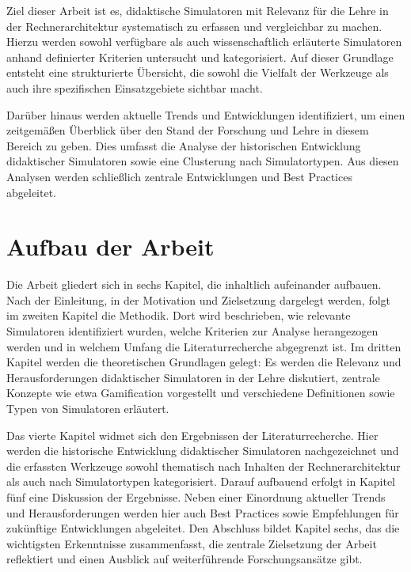 Ziel dieser Arbeit ist es, didaktische Simulatoren mit Relevanz für die Lehre in der Rechnerarchitektur systematisch zu erfassen und vergleichbar zu machen. Hierzu werden sowohl verfügbare als auch wissenschaftlich erläuterte Simulatoren anhand definierter Kriterien untersucht und kategorisiert. Auf dieser Grundlage entsteht eine strukturierte Übersicht, die sowohl die Vielfalt der Werkzeuge als auch ihre spezifischen Einsatzgebiete sichtbar macht.

Darüber hinaus werden aktuelle Trends und Entwicklungen identifiziert, um einen zeitgemäßen Überblick über den Stand der Forschung und Lehre in diesem Bereich zu geben. Dies umfasst die Analyse der historischen Entwicklung didaktischer Simulatoren sowie eine Clusterung nach Simulatortypen. Aus diesen Analysen werden schließlich zentrale Entwicklungen und Best Practices abgeleitet.

\section{Aufbau der Arbeit}

Die Arbeit gliedert sich in sechs Kapitel, die inhaltlich aufeinander aufbauen. Nach der Einleitung, in der Motivation und Zielsetzung dargelegt werden, folgt im zweiten Kapitel die Methodik. Dort wird beschrieben, wie relevante Simulatoren identifiziert wurden, welche Kriterien zur Analyse herangezogen werden und in welchem Umfang die Literaturrecherche abgegrenzt ist. Im dritten Kapitel werden die theoretischen Grundlagen gelegt: Es werden die Relevanz und Herausforderungen didaktischer Simulatoren in der Lehre diskutiert, zentrale Konzepte wie etwa Gamification vorgestellt und verschiedene Definitionen sowie Typen von Simulatoren erläutert.

Das vierte Kapitel widmet sich den Ergebnissen der Literaturrecherche. Hier werden die historische Entwicklung didaktischer Simulatoren nachgezeichnet und die erfassten Werkzeuge sowohl thematisch nach Inhalten der Rechnerarchitektur als auch nach Simulatortypen kategorisiert. Darauf aufbauend erfolgt in Kapitel fünf eine Diskussion der Ergebnisse. Neben einer Einordnung aktueller Trends und Herausforderungen werden hier auch Best Practices sowie Empfehlungen für zukünftige Entwicklungen abgeleitet. Den Abschluss bildet Kapitel sechs, das die wichtigsten Erkenntnisse zusammenfasst, die zentrale Zielsetzung der Arbeit reflektiert und einen Ausblick auf weiterführende Forschungsansätze gibt.

